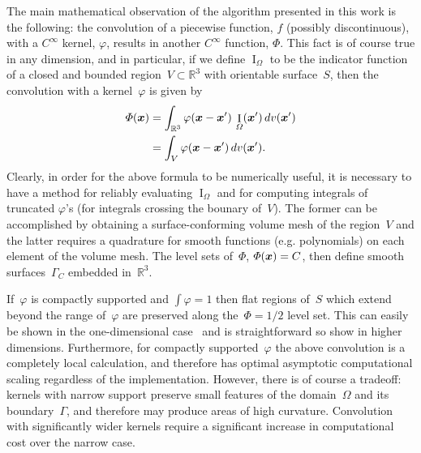 \documentclass[11pt]{article}
\numberwithin{equation}{section}
\newcommand{\vct}{\vectorsym}
\DeclareMathOperator\indic{I}
\newcommand\bbR{\mathbb R}
\newcommand\bx{\vct{x}}
\renewcommand{\phi}{\varphi}
\begin{document}
The main mathematical observation of the algorithm presented in this
work is the following: the convolution of a piecewise function, $f$
(possibly discontinuous), with a $C^\infty$ kernel, $\phi$, results in
another $C^\infty$ function, $\Phi$. This fact is of course true in any
dimension, and in particular, if we define $\indic_\Omega$ to be the
indicator function of a closed and bounded
region~$V \subset \bbR^3$ with orientable surface~$S$, then
the convolution with a kernel~$\phi$ is given by
\begin{equation}
\begin{aligned}
\Phi(\bx) &= \int_{\bbR^3} \phi(\bx-\bx') \, \indic_\Omega(\bx') \, dv(\bx') \\
 &= \int_{V} \phi(\bx-\bx')  \, dv(\bx').
\end{aligned}
\end{equation}
Clearly, in order for the above formula to be numerically useful, it
is necessary to have a method for reliably evaluating $\indic_\Omega$
and for computing integrals of truncated $\phi$'s (for integrals
crossing the bounary of~$V$). The former can be
accomplished by obtaining a surface-conforming volume mesh of the
region~$V$ and the latter requires a quadrature for smooth
functions (e.g. polynomials) on each element of the volume mesh. The
level sets of~$\Phi$, $\Phi(\bx) = C$, then define smooth
surfaces~$\Gamma_C$ embedded in~$\bbR^3$.

If~$\phi$ is compactly supported and $\int \phi = 1$ then flat regions
of~$S$ which extend beyond the range of~$\phi$ are preserved
along the~$\Phi = 1/2$ level set. This can easily be shown in the
one-dimensional case~\cite{epstein_2016} and is straightforward so
show in higher dimensions. Furthermore, for compactly supported~$\phi$
the above convolution is a completely local calculation, and therefore
has optimal asymptotic computational scaling regardless of the
implementation. However, there is of course a tradeoff: kernels with
narrow support preserve small features of the domain~$\Omega$ and its
boundary~$\Gamma$, and therefore may produce areas of high
curvature. Convolution with significantly wider kernels require a
significant increase in computational cost over the narrow case.
\end{document}
